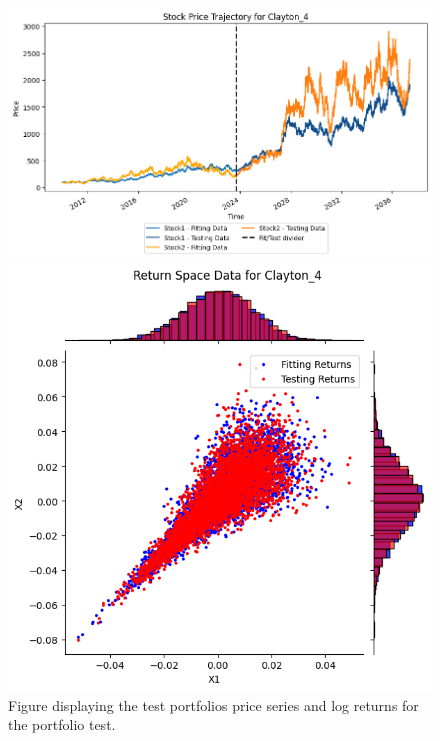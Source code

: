 \begin{figure}
\begin{minipage}{0.9\textwidth}
\begin{minipage}{0.34\textwidth}
        \end{minipage}
    \end{minipage}
    \hfill
    \begin{minipage}{0.9\textwidth}
        \centering
        \begin{minipage}{0.54\textwidth}
            \centering
            \includegraphics[width=\textwidth]{4Method/pictures/PricesClayton_4.png}
        \end{minipage}
        \hfill
        \begin{minipage}{0.34\textwidth}
            \centering
            \includegraphics[width=\textwidth]{4Method/pictures/ReturnsClayton_4.png}
        \end{minipage}
    \end{minipage}
    \caption{Figure displaying the test portfolios price series and log returns for the portfolio test.}
    \label{fig:DatasetsUsed}
\end{figure}
